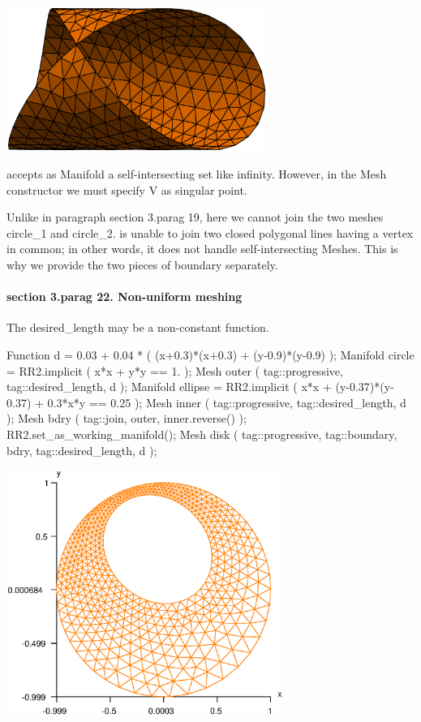{\bigskip
\centerline{\includegraphics[width=85mm]{cyl.eps}}
\bigskip

{\ManiFEM} accepts as {\codett Manifold} a self-intersecting set like {\codett infinity}.
However, in the {\codett Mesh} constructor we must specify {\codett V} as singular point.

Unlike in paragraph \numb section 3.\numb parag 19, here we cannot {\codett join} the two
meshes {\codett circle\_1} and {\codett circle\_2}.
{\ManiFEM} is unable to join two closed polygonal lines having a vertex in common;
in other words, it does not handle self-intersecting {\codett Meshes}.
This is why we provide the two pieces of boundary separately.


\paragraph{\numb section 3.\numb parag 22. Non-uniform meshing}

The {\codett desired\_length} may be a non-constant function.

\verbatim
   Function d = 0.03 + 0.04 * ( (x+0.3)*(x+0.3) + (y-0.9)*(y-0.9) );
   Manifold circle = RR2.implicit ( x*x + y*y == 1. );
   Mesh outer ( tag::progressive, tag::desired_length, d );
   Manifold ellipse = RR2.implicit ( x*x + (y-0.37)*(y-0.37) + 0.3*x*y == 0.25 );
   Mesh inner ( tag::progressive, tag::desired_length, d );
   Mesh bdry ( tag::join, outer, inner.reverse() );
   RR2.set_as_working_manifold();
   Mesh disk ( tag::progressive, tag::boundary, bdry, tag::desired_length, d );
\endverbatim

\centerline{\includegraphics[width=90mm]{disk-non-unif.eps}}
\medskip

}
